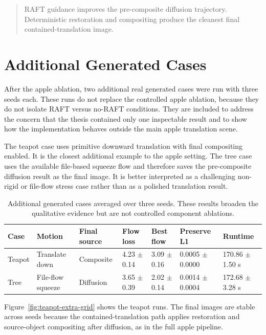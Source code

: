 \begin{quote}
RAFT guidance improves the pre-composite diffusion trajectory. Deterministic restoration and compositing produce the cleanest final contained-translation image.
\end{quote}

\section{Additional Generated Cases}

After the apple ablation, two additional real generated cases were run with three seeds each. These runs do not replace the controlled apple ablation, because they do not isolate RAFT versus no-RAFT conditions. They are included to address the concern that the thesis contained only one inspectable result and to show how the implementation behaves outside the main apple translation scene.

The teapot case uses primitive downward translation with final compositing enabled. It is the closest additional example to the apple setting. The tree case uses the available file-based squeeze flow and therefore saves the pre-composite diffusion result as the final image. It is better interpreted as a challenging non-rigid or file-flow stress case rather than as a polished translation result.

\begin{table}[p]
  \centering
  \scriptsize
  \caption{Additional generated cases averaged over three seeds. These results broaden the qualitative evidence but are not controlled component ablations.}
  \label{tab:additional-generated-results}
  \renewcommand{\arraystretch}{1.12}
  \begin{tabular}{p{0.72in}|p{0.82in}|p{0.72in}|p{0.58in}|p{0.58in}|p{0.66in}|p{0.66in}}
    \hline
    \textbf{Case} & \textbf{Motion} & \textbf{Final source} & \textbf{Flow loss} & \textbf{Best flow} & \textbf{Preserve L1} & \textbf{Runtime} \\ \hline \hline
    Teapot & Translate down & Composite & 4.23 $\pm$ 0.14 & 3.09 $\pm$ 0.16 & 0.0005 $\pm$ 0.0000 & 170.86 $\pm$ 1.50 s \\ \hline
    Tree & File-flow squeeze & Diffusion & 3.65 $\pm$ 0.39 & 2.02 $\pm$ 0.14 & 0.0014 $\pm$ 0.0004 & 172.68 $\pm$ 3.28 s \\ \hline
  \end{tabular}
\end{table}

Figure~\ref{fig:teapot-extra-grid} shows the teapot runs. The final images are stable across seeds because the contained-translation path applies restoration and source-object compositing after diffusion, as in the full apple pipeline.

